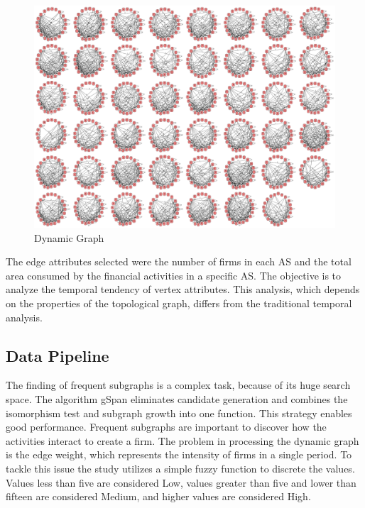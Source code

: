\documentclass[12pt]{article}
\begin{document}
\begin{figure}[h]
    \centering
    \includegraphics[width=0.75\linewidth]{montage.png}
    \caption{Dynamic Graph}
    \label{fig:dg}
\end{figure}

The edge attributes selected were the number of firms in each AS and the total area consumed by the financial activities in a specific AS. The objective is to analyze the temporal tendency of vertex attributes. This analysis, which depends on the properties of the topological graph, differs from the traditional temporal analysis.

\subsection{Data Pipeline} 
The finding of frequent subgraphs is a complex task, because of its huge search space. The algorithm gSpan \cite{yan2002gspan} eliminates candidate generation and combines the isomorphism test and subgraph growth into one function. This strategy enables good performance. Frequent subgraphs are important to discover how the activities interact to create a firm. The problem in processing the dynamic graph is the edge weight, which represents the intensity of firms in a single period. To tackle this issue the study utilizes a simple fuzzy function to discrete the values. Values less than five are considered Low, values greater than five and lower than fifteen are considered Medium, and higher values are considered High.
\end{document}
